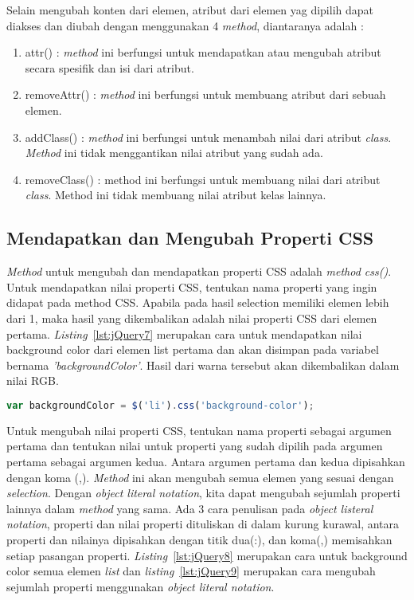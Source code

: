 Selain mengubah konten dari elemen, atribut dari elemen yag dipilih dapat diakses dan diubah dengan menggunakan 4 \textit{method}, diantaranya adalah :

\begin{enumerate}
	\item attr() : \textit{method} ini berfungsi untuk mendapatkan atau mengubah atribut secara spesifik dan isi dari atribut.
	\item removeAttr() : \textit{method} ini berfungsi untuk membuang atribut dari sebuah elemen.
	\item addClass() : \textit{method} ini berfungsi untuk menambah nilai dari atribut \textit{class}. \textit{Method} ini tidak menggantikan nilai atribut yang sudah ada.
	\item removeClass() : method ini berfungsi untuk membuang nilai dari atribut \textit{class}. Method ini tidak membuang nilai atribut kelas lainnya.
\end{enumerate}

\subsection{Mendapatkan dan Mengubah Properti CSS}
\textit{Method} untuk mengubah dan mendapatkan properti CSS adalah \textit{method css()}. Untuk mendapatkan nilai properti CSS, tentukan nama properti yang ingin didapat pada method CSS. Apabila pada hasil selection memiliki elemen lebih dari 1, maka hasil yang dikembalikan adalah nilai properti CSS dari elemen pertama. \textit{Listing}~\ref{lst:jQuery7} merupakan cara untuk mendapatkan nilai background color dari elemen list pertama dan akan disimpan pada variabel bernama \textit{'backgroundColor'}. Hasil dari warna tersebut akan dikembalikan dalam nilai RGB. 

\begin{lstlisting}[language=Javascript, caption=Mendapatkan nilai warna \textit{background color} dari elemen \textit{list} pertama, label={lst:jQuery7}]
	var backgroundColor = $('li').css('background-color');
\end{lstlisting}

Untuk mengubah nilai properti CSS, tentukan nama properti sebagai argumen pertama dan tentukan nilai untuk properti yang sudah dipilih pada argumen pertama sebagai argumen kedua. Antara argumen pertama dan kedua dipisahkan dengan koma (,). \textit{Method} ini akan mengubah semua elemen yang sesuai dengan \textit{selection}. Dengan \textit{object literal notation}, kita dapat mengubah sejumlah properti lainnya dalam \textit{method} yang sama. Ada 3 cara penulisan pada \textit{object listeral notation}, properti dan nilai properti dituliskan di dalam kurung kurawal, antara properti dan nilainya dipisahkan dengan titik dua(:), dan koma(,) memisahkan setiap pasangan properti. \textit{Listing}~\ref{lst:jQuery8} merupakan cara untuk background color semua elemen \textit{list} dan \textit{listing}~\ref{lst:jQuery9} merupakan cara mengubah sejumlah properti menggunakan \textit{object literal notation}.

